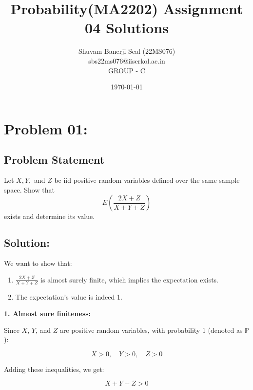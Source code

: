 \documentclass{article}
\title{Probability(MA2202) Assignment 04 Solutions}
\author{Shuvam Banerji Seal (22MS076)\\ \small sbs22ms076@iiserkol.ac.in \\ GROUP - C}
\date{\today} %
\theoremstyle{definition}
\begin{document}
\maketitle

\section{Problem 01:}
\begin{mdframed}[style = MyFrame]
\subsection{Problem Statement}
    Let \(X, Y,\) and \(Z\) be iid positive random variables defined over the same sample space. Show that
\[
E\left( \frac{2X + Z}{X + Y + Z} \right)
\]
exists and determine its value.

\end{mdframed}

\subsection{Solution:}
We want to show that:

\begin{enumerate}
    \item $\frac{2X + Z}{X + Y + Z}$ is almost surely finite, which implies the expectation exists.
    \item The expectation's value is indeed 1.
\end{enumerate}

\textbf{1. Almost sure finiteness:}

Since $X$, $Y$, and $Z$ are positive random variables, with probability 1 (denoted as $\mathbb{P}$):

$$X > 0, \quad Y > 0, \quad Z > 0$$

Adding these inequalities, we get:

$$X + Y + Z > 0$$
\begin{comment}
    Also note that, 
\[
\frac{2X +Z}{X + Y+Z} = 2 \frac{X}{X+Y+Z} + \frac{Z}{X+Y+Z}
\]
Since all are IID,
\[
\frac{X}{X+Y+Z} , \frac{Z}{X+Y+Z} \leq 1
\]


Therefore, for any realization $(x, y, z)$ in the sample space, the denominator $X + Y + Z$ is strictly positive. As the numerator $2X + Z$ is a sum of non-negative terms, it's also non-negative. The resulting fraction, $\frac{2X + Z}{X + Y + Z}$, is therefore finite for all realizations. This implies it's almost surely finite, ie, 
\[
\therefore  0 \leq  \frac{2X +Z}{X + Y+Z} \leq 2 + 1 = 3
\]

\end{comment}
\end{document}
